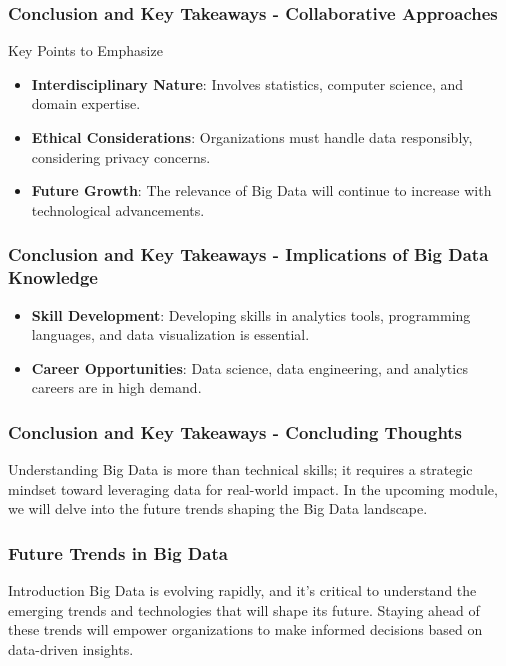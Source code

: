 \documentclass[aspectratio=169]{beamer}
\begin{document}
\begin{frame}[fragile]
    \frametitle{Conclusion and Key Takeaways - Collaborative Approaches}
    \begin{block}{Key Points to Emphasize}
        \begin{itemize}
            \item \textbf{Interdisciplinary Nature}: 
            Involves statistics, computer science, and domain expertise.
            \item \textbf{Ethical Considerations}: 
            Organizations must handle data responsibly, considering privacy concerns.
            \item \textbf{Future Growth}: 
            The relevance of Big Data will continue to increase with technological advancements.
        \end{itemize}
    \end{block}
\end{frame}

\begin{frame}[fragile]
    \frametitle{Conclusion and Key Takeaways - Implications of Big Data Knowledge}
    \begin{itemize}
        \item \textbf{Skill Development}: 
        Developing skills in analytics tools, programming languages, and data visualization is essential.

        \item \textbf{Career Opportunities}: 
        Data science, data engineering, and analytics careers are in high demand.
    \end{itemize}
\end{frame}

\begin{frame}[fragile]
    \frametitle{Conclusion and Key Takeaways - Concluding Thoughts}
    Understanding Big Data is more than technical skills; it requires a strategic mindset toward leveraging data for real-world impact. 
    In the upcoming module, we will delve into the future trends shaping the Big Data landscape.
\end{frame}

\begin{frame}[fragile]
    \frametitle{Future Trends in Big Data}
    \begin{block}{Introduction}
        Big Data is evolving rapidly, and it's critical to understand the emerging trends and technologies that will shape its future. Staying ahead of these trends will empower organizations to make informed decisions based on data-driven insights.
    \end{block}
\end{frame}
\end{document}
